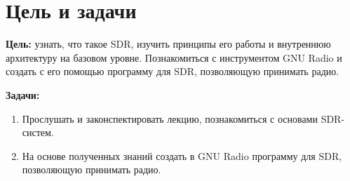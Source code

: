 \chapter{Цель и задачи}
\label{ch:intro}

\noindent
\textbf{Цель:}  
узнать, что такое SDR, изучить принципы его работы и внутреннюю архитектуру на базовом уровне.  
Познакомиться с инструментом GNU Radio и создать с его помощью программу для SDR, позволяющую принимать радио.  

\vspace{0.5cm}

\noindent
\textbf{Задачи:}
\begin{enumerate}
    \item Прослушать и законспектировать лекцию, познакомиться с основами SDR-систем.
    \item На основе полученных знаний создать в GNU Radio программу для SDR, позволяющую принимать радио. 
\end{enumerate}

\endinput